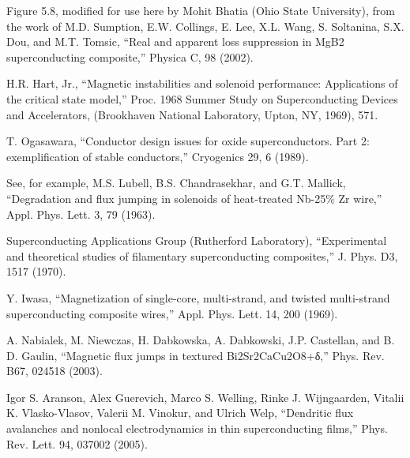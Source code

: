 \noindent [5.7] Figure 5.8, modified for use here by Mohit Bhatia (Ohio State University), from the
work of M.D. Sumption, E.W. Collings, E. Lee, X.L. Wang, S. Soltanina, S.X. Dou,
and M.T. Tomsic, “Real and apparent loss suppression in MgB2 superconducting
composite,” Physica C, 98 (2002).

\noindent [5.8] H.R. Hart, Jr., “Magnetic instabilities and solenoid performance: Applications of
the critical state model,” Proc. 1968 Summer Study on Superconducting Devices
and Accelerators, (Brookhaven National Laboratory, Upton, NY, 1969), 571.

\noindent [5.9] T. Ogasawara, “Conductor design issues for oxide superconductors. Part 2: exemplification
of stable conductors,” Cryogenics 29, 6 (1989).

\noindent [5.10] See, for example, M.S. Lubell, B.S. Chandrasekhar, and G.T. Mallick, “Degradation
and flux jumping in solenoids of heat-treated Nb-25\% Zr wire,” Appl. Phys.
Lett. 3, 79 (1963).

\noindent [5.11] Superconducting Applications Group (Rutherford Laboratory), “Experimental and
theoretical studies of filamentary superconducting composites,” J. Phys. D3, 1517
(1970).

\noindent [5.12] Y. Iwasa, “Magnetization of single-core, multi-strand, and twisted multi-strand
superconducting composite wires,” Appl. Phys. Lett. 14, 200 (1969).

\noindent [5.13] A. Nabialek, M. Niewczas, H. Dabkowska, A. Dabkowski, J.P. Castellan, and B. D. Gaulin, “Magnetic flux jumps in textured Bi2Sr2CaCu2O8+δ,” Phys. Rev. B67, 024518 (2003).

\noindent [5.14] Igor S. Aranson, Alex Guerevich, Marco S. Welling, Rinke J. Wijngaarden, Vitalii
K. Vlasko-Vlasov, Valerii M. Vinokur, and Ulrich Welp, “Dendritic flux avalanches
and nonlocal electrodynamics in thin superconducting films,” Phys. Rev. Lett. 94,
037002 (2005).
